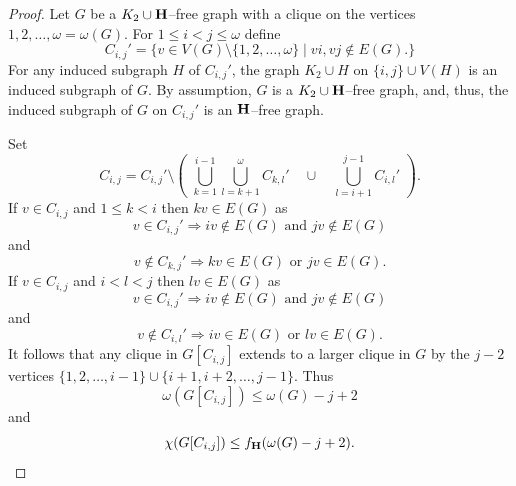 \documentclass[10pt,a4paper]{amsart}
\begin{document}
\begin{proof}
Let $G$ be a $K_2 \cup {\bf H  } $--free graph with a clique on the vertices $1,2,\ldots, \omega=\omega(G).$
For $1\leq i < j \leq \omega$ define
\[
C_{i,j}' = \{ v\in V(G) \setminus \{1,2,\ldots, \omega\} \mid vi,vj \not\in E(G).  \}
\]
For any induced subgraph $H$ of $C_{i,j}'$, the graph $K_2 \cup H$ on $\{i,j\} \cup V(H)$ is an induced subgraph of $G.$ By assumption, $G$ is a $K_2 \cup {\bf H  } $--free graph, and, thus, the induced subgraph of $G$ on $C_{i,j}' $ is an  ${\bf H  } $--free graph.

Set
\[
C_{i,j} = C_{i,j}' \setminus  \left(\,\, \bigcup_{k=1}^{i-1} \bigcup_{l=k+1}^\omega C_{k,l}'   \quad \cup \quad  \bigcup_{l=i+1}^{j-1} C_{i,l}'  \,\,  \right). 
\]
If $v\in C_{i,j}$ and $1\leq k < i$ then $kv \in E(G)$ as 
\[ v\in C_{i,j}' \Rightarrow iv \not\in E(G) \textrm{ and }  jv \not\in E(G) \]
and
\[ v\not\in C_{k,j}' \Rightarrow kv \in E(G) \textrm{ or }  jv \in E(G). \]
If $v\in C_{i,j}$ and $i< l < j$ then $lv \in E(G)$ as 
\[ v\in C_{i,j}' \Rightarrow iv \not\in E(G) \textrm{ and }  jv \not\in E(G) \]
and
\[ v\not\in C_{i,l}' \Rightarrow iv \in E(G) \textrm{ or }  lv \in E(G). \]
It follows that any clique in $G[C_{i,j}]$ extends to a larger clique in $G$ by the $j-2$ vertices
$\{1,2,\ldots,i-1\} \cup \{ i+1,i+2,\ldots, j-1 \}.$ 
Thus
\[ \omega(G[C_{i,j}]) \leq \omega(G)-j+2\]
and
\[ \chi(G[C_{i,j}]) \leq f_{{\bf H  } }( \omega(G)-j+2 ). \]


\end{proof}
\end{document}
